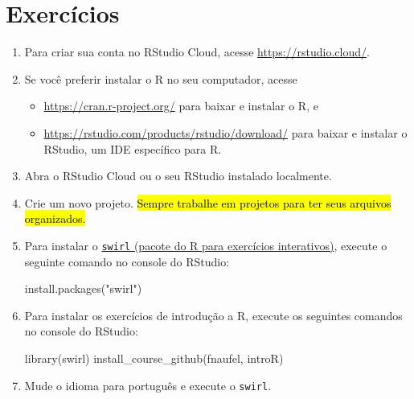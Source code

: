 \documentclass[
  11pt]{report}
\newenvironment{Shaded}{\begin{snugshade}}{\end{snugshade}}
\newcommand{\FunctionTok}[1]{\textcolor[rgb]{0.00,0.00,0.00}{#1}}
\newcommand{\NormalTok}[1]{#1}
\newcommand{\StringTok}[1]{\textcolor[rgb]{0.31,0.60,0.02}{#1}}
\renewenvironment{Shaded}{
    \begin{mdframed}[%
      roundcorner=2pt,%
      innerleftmargin=5pt,%
      innerrightmargin=5pt,%
      topline=true,%
      leftline=true,%
      rightline=true,%
      bottomline=true,%
      linewidth=0.5pt,%
      linecolor=black!20,%
      backgroundcolor=black!2,%
      skipabove=2ex,%
      skipbelow=2.5ex%
    ]%
  }
  {
    \end{mdframed}
  }
\begin{document}
\hypertarget{exercuxedcios-2}{%
\section{Exercícios}\label{exercuxedcios-2}}

\begin{enumerate}
\def\labelenumi{\arabic{enumi}.}
\item
  Para criar sua conta no RStudio Cloud, acesse \url{https://rstudio.cloud/}.
\item
  Se você preferir instalar o R no seu computador, acesse

  \begin{itemize}
  \item
    \url{https://cran.r-project.org/} para baixar e instalar o R, e
  \item
    \url{https://rstudio.com/products/rstudio/download/} para baixar e instalar o RStudio, um IDE específico para R.
  \end{itemize}
\item
  Abra o RStudio Cloud ou o seu RStudio instalado localmente.
\item
  Crie um novo projeto. {\hl{Sempre trabalhe em projetos para ter seus arquivos organizados.}}
\item
  Para instalar o \href{https://swirlstats.com/}{\texttt{swirl} (pacote do R para exercícios interativos)}, execute o seguinte comando no console do RStudio:

\begin{Shaded}
\begin{Highlighting}[]
\FunctionTok{install.packages}\NormalTok{(}\StringTok{"swirl"}\NormalTok{)}
\end{Highlighting}
\end{Shaded}
\item
  Para instalar os exercícios de introdução a R, execute os seguintes comandos no console do RStudio:

\begin{Shaded}
\begin{Highlighting}[]
\FunctionTok{library}\NormalTok{(swirl)}
\FunctionTok{install\_course\_github}\NormalTok{(}\StringTok{\textquotesingle{}fnaufel\textquotesingle{}}\NormalTok{, }\StringTok{\textquotesingle{}introR\textquotesingle{}}\NormalTok{)}
\end{Highlighting}
\end{Shaded}
\item
  Mude o idioma para português e execute o \texttt{swirl}.


\end{enumerate}
\end{document}
